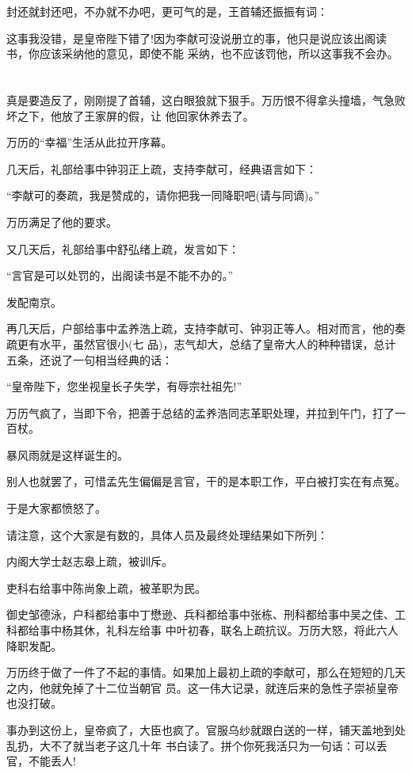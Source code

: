 \documentclass[11pt,a4paper,onecolumn]{article}
\begin{document}
封还就封还吧，不办就不办吧，更可气的是，王首辅还振振有词：

这事我没错，是皇帝陛下错了!因为李献可没说册立的事，他只是说应该出阁读书，你应该采纳他的意见，即使不能
采纳，也不应该罚他，所以这事我不会办。

\section[\thesection]{}

真是要造反了，刚刚提了首辅，这白眼狼就下狠手。万历恨不得拿头撞墙，气急败坏之下，他放了王家屏的假，让
他回家休养去了。

万历的``幸福''生活从此拉开序幕。

几天后，礼部给事中钟羽正上疏，支持李献可，经典语言如下：

``李献可的奏疏，我是赞成的，请你把我一同降职吧(请与同谪)。''

万历满足了他的要求。

又几天后，礼部给事中舒弘绪上疏，发言如下：

``言官是可以处罚的，出阁读书是不能不办的。''

发配南京。

再几天后，户部给事中孟养浩上疏，支持李献可、钟羽正等人。相对而言，他的奏疏更有水平，虽然官很小(七
品)，志气却大，总结了皇帝大人的种种错误，总计五条，还说了一句相当经典的话：

``皇帝陛下，您坐视皇长子失学，有辱宗社祖先!''

万历气疯了，当即下令，把善于总结的孟养浩同志革职处理，并拉到午门，打了一百杖。

暴风雨就是这样诞生的。

别人也就罢了，可惜孟先生偏偏是言官，干的是本职工作，平白被打实在有点冤。

于是大家都愤怒了。

请注意，这个大家是有数的，具体人员及最终处理结果如下所列：

内阁大学士赵志皋上疏，被训斥。

吏科右给事中陈尚象上疏，被革职为民。

御史邹德泳，户科都给事中丁懋逊、兵科都给事中张栋、刑科都给事中吴之佳、工科都给事中杨其休，礼科左给事
中叶初春，联名上疏抗议。万历大怒，将此六人降职发配。

万历终于做了一件了不起的事情。如果加上最初上疏的李献可，那么在短短的几天之内，他就免掉了十二位当朝官
员。这一伟大记录，就连后来的急性子崇祯皇帝也没打破。

事办到这份上，皇帝疯了，大臣也疯了。官服乌纱就跟白送的一样，铺天盖地到处乱扔，大不了就当老子这几十年
书白读了。拼个你死我活只为一句话：可以丢官，不能丢人!
\end{document}
